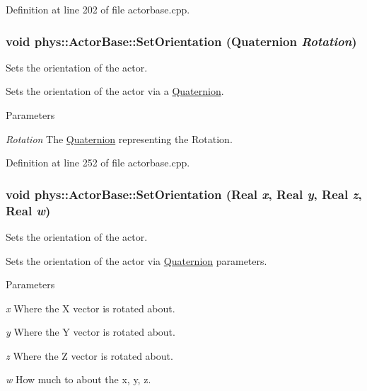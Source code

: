 Definition at line 202 of file actorbase.cpp.

\hypertarget{classphys_1_1ActorBase_ac4b0bf1eff730d94f72d04957efea69d}{
\subsubsection[{SetOrientation}]{\setlength{\rightskip}{0pt plus 5cm}void phys::ActorBase::SetOrientation ({\bf Quaternion} {\em Rotation})}}
\label{d8/d0f/classphys_1_1ActorBase_ac4b0bf1eff730d94f72d04957efea69d}


Sets the orientation of the actor. 

Sets the orientation of the actor via a \hyperlink{classphys_1_1Quaternion}{Quaternion}. 
\begin{DoxyParams}{Parameters}
\item[{\em Rotation}]The \hyperlink{classphys_1_1Quaternion}{Quaternion} representing the Rotation. \end{DoxyParams}


Definition at line 252 of file actorbase.cpp.

\hypertarget{classphys_1_1ActorBase_adbf0cc77031f22597a799fd0f7f8216d}{
\subsubsection[{SetOrientation}]{\setlength{\rightskip}{0pt plus 5cm}void phys::ActorBase::SetOrientation ({\bf Real} {\em x}, \/  {\bf Real} {\em y}, \/  {\bf Real} {\em z}, \/  {\bf Real} {\em w})}}
\label{d8/d0f/classphys_1_1ActorBase_adbf0cc77031f22597a799fd0f7f8216d}


Sets the orientation of the actor. 

Sets the orientation of the actor via \hyperlink{classphys_1_1Quaternion}{Quaternion} parameters. 
\begin{DoxyParams}{Parameters}
\item[{\em x}]Where the X vector is rotated about. \item[{\em y}]Where the Y vector is rotated about. \item[{\em z}]Where the Z vector is rotated about. \item[{\em w}]How much to about the x, y, z. \end{DoxyParams}


